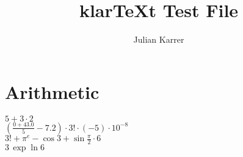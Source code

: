 \documentclass[oneside, a4paper]{article}
\author{Julian Karrer}
\title{klarTeXt Test File}
\begin{document}
\maketitle
\section*{Arithmetic}

\begin{program}
$5+3\cdot 2$\\
$\left(\frac{0+43.0}{5}-7.2\right)\cdot 3! \cdot (-5) \cdot 10^{-8}$\\
$3! + \pi^e - \cos 3 + \sin\frac{\pi}{2} \cdot 6$\\
$3\,\exp{\ln 6}$
\end{program}
\end{document}
